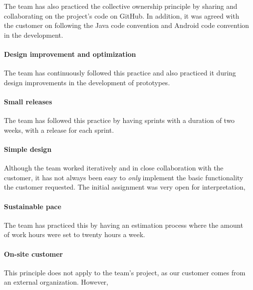 The team has also practiced the collective ownership principle by sharing and collaborating on the project's code on GitHub. In addition, it was agreed with the customer on following the Java code convention and Android code convention in the development.

\paragraph{Design improvement and optimization}
The team has continuously followed this practice and also practiced it during design improvements in the development of prototypes.
 
\paragraph{Small releases}
The team has followed this practice by having sprints with a duration of two weeks, with a release for each sprint.


\paragraph{Simple design}
Although the team worked iteratively and in close collaboration with the customer, it has not always been easy to \emph{only} implement the basic functionality the customer requested. The initial assignment was very open for interpretation,  

\paragraph{Sustainable pace}
The team has practiced this by having an estimation process where the amount of work hours were set to twenty hours a week.

\paragraph{On-site customer}
This principle does not apply to the team's project, as our customer comes from an external organization. However,

